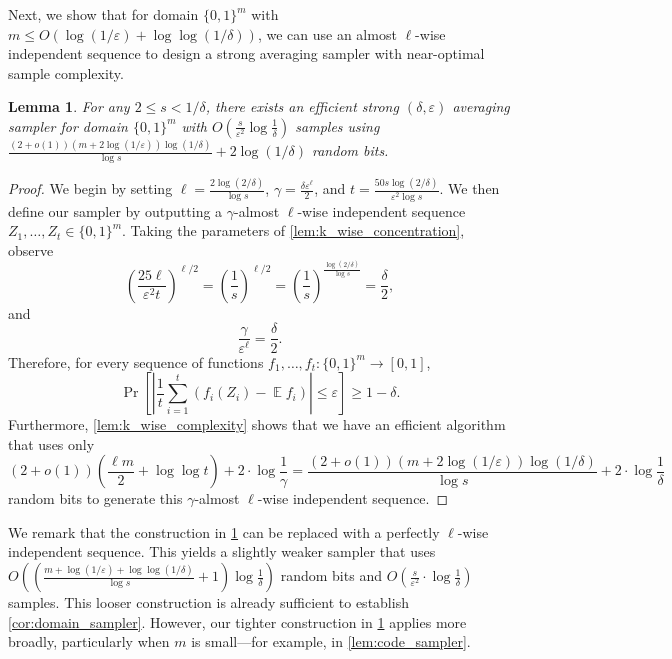 \documentclass[10pt,a4paper]{article}
\newtheorem{lemma}[theorem]{Lemma}
\DeclareMathOperator*{\E}{\mathbb{E}}
\newcommand{\eps}{\varepsilon}
\newcommand{\1}{\mathbbm{1}}
\newcommand{\abs}[1]{\left|#1\right| }
\newcommand{\tuple}[1]{\left(#1\right)}
\newcommand{\zo}{\{0, 1\}}
\newcommand{\Prb}[2][]{\Pr_{#1}\left[#2\right]}
\begin{document}
Next, we show that for domain $\zo^m$ with $m \le O(\log (1 / \eps) + \log\log (1 / \delta))$, we can use an almost $\ell$-wise independent sequence to design a strong averaging sampler with near-optimal sample complexity. 

\begin{lemma}
\label{lem:general_ell_wise_sampler}
    For any $2 \le s < 1 / \delta$, there exists an efficient strong $(\delta, \eps)$ averaging sampler for domain $\zo^m$ with $O(\frac{s}{\eps^{2}}\log \frac{1}{\delta})$ samples using 
    ${\frac{(2 + o(1))(m + 2\log(1 / \eps))\log(1 / \delta)}{\log s}} + 2 \log (1 / \delta)$
    random bits.
\end{lemma}
\begin{proof}
    We begin by setting $\ell = \frac{2\log(2 / \delta)}{\log s}$, $\gamma = \frac{\delta\eps^\ell}{2}$, and $t = \frac{50s \log (2 / \delta)}{  \eps^{2} \log s}$. We then define our sampler by outputting a $\gamma$-almost $\ell$-wise independent  sequence $Z_1, \dots, Z_t \in \zo^m$. 
    Taking the parameters of \cref{lem:k_wise_concentration}, observe \[
        \tuple{\frac{25{\ell}}{\eps^2 {t}}}^{\ell/2}
        = \tuple{\frac{1}{s}}^{\ell/2} = \tuple{\frac{1}{s}}^{\frac{\log(2/\delta)}{\log s}}
        =  \frac{\delta}{2},
    \]
    and \[
        \frac{\gamma}{\eps^\ell} = \frac{\delta}{2}.
    \]
     Therefore, for every sequence of functions $f_1, \dots, f_t : \zo^m \to [0, 1]$, \[
        \Prb{\abs{\frac{1}{t}\sum_{i=1}^t (f_i(Z_i) - \E f_i)} \le \eps} \ge 1 - \delta.
    \]
     Furthermore, \cref{lem:k_wise_complexity} shows that we have an efficient algorithm that uses only \[
     (2 + o(1))\tuple{\frac{\ell m}{2} + \log\log t} + 2 \cdot {\log\frac{1}{\gamma}}  = 
     {\frac{(2 + o(1))(m + 2\log(1 / \eps))\log(1 / \delta)}{\log s}} + 2 \cdot {\log\frac{1}{\delta}}
     \]
    random bits to generate this $\gamma$-almost $\ell$-wise independent  sequence.
\end{proof}

We remark that the construction in \cref{lem:general_ell_wise_sampler} can be replaced with a perfectly \( \ell \)-wise independent sequence. This yields a slightly weaker sampler that uses  
$
O\left( \left( \frac{m + \log(1 / \eps) + \log \log(1 / \delta)}{\log s} + 1 \right) \log \frac{1}{\delta} \right)
$
random bits and  
$
O\left( \frac{s}{\eps^2} \cdot \log \frac{1}{\delta} \right)
$
samples.  
This looser construction is already sufficient to establish \cref{cor:domain_sampler}. However, our tighter construction in \cref{lem:general_ell_wise_sampler} applies more broadly, particularly when \( m \) is small—for example, in \cref{lem:code_sampler}.
\end{document}
